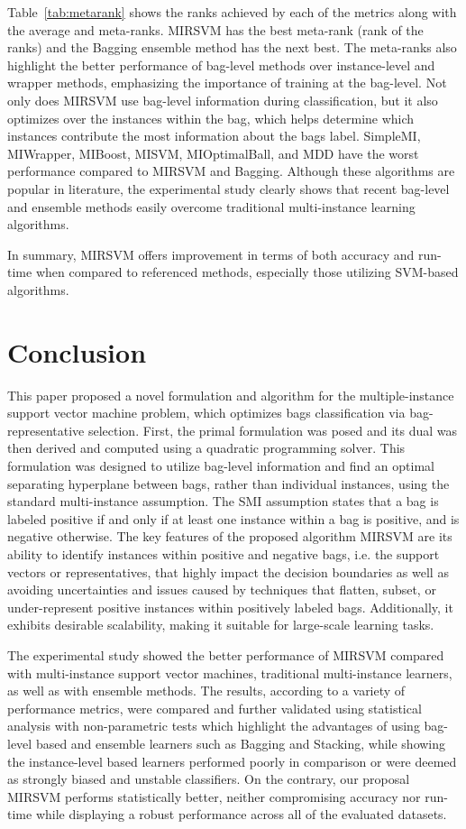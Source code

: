 \documentclass[preprint,12pt]{elsarticle}
\begin{document}
Table~\ref{tab:metarank} shows the ranks achieved by each of the metrics along with the average and meta-ranks. MIRSVM has the best meta-rank (rank of the ranks) and the Bagging ensemble method has the next best. The meta-ranks also highlight the better performance of bag-level methods over instance-level and wrapper methods, emphasizing the importance of training at the bag-level. Not only does MIRSVM use bag-level information during classification, but it also optimizes over the instances within the bag, which helps determine which instances contribute the most information about the bags label. SimpleMI, MIWrapper, MIBoost, MISVM, MIOptimalBall, and MDD have the worst performance compared to MIRSVM and Bagging. Although these algorithms are popular in literature, the experimental study clearly shows that recent bag-level and ensemble methods easily overcome traditional multi-instance learning algorithms. 

In summary, MIRSVM offers improvement in terms of both accuracy and run-time when compared to referenced methods, especially those utilizing SVM-based algorithms.

\section{Conclusion}\label{sec:conclusion}
This paper proposed a novel formulation and algorithm for the multiple-instance support vector machine problem, which optimizes bags classification via bag-representative selection. First, the primal formulation was posed and its dual was then derived and computed using a quadratic programming solver. This formulation was designed to utilize bag-level information and find an optimal separating hyperplane between bags, rather than individual instances, using the standard multi-instance assumption. The SMI assumption states that a bag is labeled positive if and only if at least one instance within a bag is positive, and is negative otherwise. The key features of the proposed algorithm MIRSVM are its ability to identify instances within positive and negative bags, i.e. the support vectors or representatives, that highly impact the decision boundaries as well as avoiding uncertainties and issues caused by techniques that flatten, subset, or under-represent positive instances within positively labeled bags. Additionally, it exhibits desirable scalability, making it suitable for large-scale learning tasks.

The experimental study showed the better performance of MIRSVM compared with multi-instance support vector machines, traditional multi-instance learners, as well as with ensemble methods. The results, according to a variety of performance metrics, were compared and further validated using statistical analysis with non-parametric tests which highlight the advantages of using bag-level based and ensemble learners such as Bagging and Stacking, while showing the instance-level based learners performed poorly in comparison or were deemed as strongly biased and unstable classifiers. On the contrary, our proposal MIRSVM performs statistically better, neither compromising accuracy nor run-time while displaying a robust performance across all of the evaluated datasets.
\end{document}
